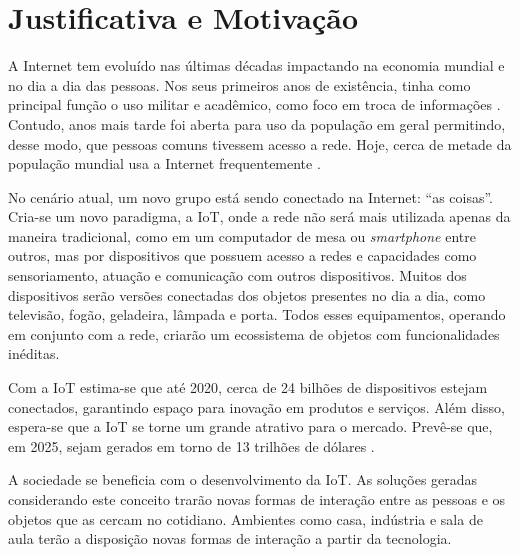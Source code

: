 \section{Justificativa e Motivação}

A Internet tem evoluído nas últimas décadas impactando na economia mundial e no dia a dia das pessoas. Nos seus primeiros anos de existência, tinha como principal função o uso militar e acadêmico, como foco em troca de informações \cite{Leiner2012}. Contudo, anos mais tarde foi aberta para uso da população em geral permitindo, desse modo, que pessoas comuns tivessem acesso a rede. Hoje, cerca de metade da população mundial usa a Internet frequentemente \cite{MiniwattsMarketingGroup2016}. 

No cenário atual, um novo grupo está sendo conectado na Internet: ``as coisas''. Cria-se um novo paradigma, a IoT, onde a rede não será mais utilizada apenas da maneira tradicional, como em um computador de mesa ou \textit{smartphone} entre outros, mas por dispositivos que possuem acesso a redes e capacidades como sensoriamento, atuação e comunicação com outros dispositivos. Muitos dos dispositivos serão versões conectadas dos objetos presentes no dia a dia, como televisão, fogão, geladeira, lâmpada e porta. Todos esses equipamentos, operando em conjunto com a rede, criarão um ecossistema de objetos com funcionalidades inéditas. 

Com a IoT estima-se que até 2020, cerca de 24 bilhões de dispositivos estejam conectados, garantindo espaço para inovação em produtos e serviços. Além disso, espera-se que a IoT se torne um grande atrativo para o mercado. Prevê-se que, em 2025, sejam gerados em torno de 13 trilhões de dólares \cite{Meola2016}.

A sociedade se beneficia com o desenvolvimento da IoT. As soluções geradas considerando este conceito trarão novas formas de interação entre as pessoas e os objetos que as cercam no cotidiano. Ambientes como casa, indústria e sala de aula terão a disposição novas formas de interação a partir da tecnologia. 

